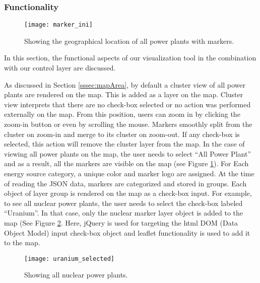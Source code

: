 \subsubsection{Functionality}
\label{sssec:functionality}

\begin{figure} [H]
  \begin{center}
    \texttt{[image: marker\_ini]}
    \caption{Showing the geographical location of all power plants with markers.}
    \label{fig:markerini}
  \end{center}
\end{figure}

In this section, the functional aspects of our visualization tool in the combination with our control layer are discussed.

As discussed in Section \ref{sssec:mapArea}, by default a cluster view of all power plants are rendered on the map. This is added as a layer on the map. Cluster view interprets that there are no check-box selected or no action was performed externally on the map. From this position, users can zoom in by clicking the zoom-in button or even by scrolling the mouse. Markers smoothly split from the cluster on zoom-in and merge to its cluster on zoom-out. If any check-box is selected, this action will remove the cluster layer from the map. In the case of viewing all power plants on the map, the user needs to select “All Power Plant” and as a result, all the markers are visible on the map (see Figure \ref{fig:markerini}). For Each energy source category, a unique color and marker logo are assigned. At the time of reading the JSON data, markers are categorized and stored in groups. Each object of layer group is rendered on the map as a check-box input. For example,  to see all nuclear power plants, the user needs to select the check-box labeled “Uranium”. In that case, only the nuclear marker layer object is added to the map (See Figure \ref{fig:uranium}. Here, jQuery is used for targeting the html DOM (Data Object Model) input check-box object and leaflet functionality is used to add it to the map. 

\begin{figure}
  \begin{center}
    \texttt{[image: uranium\_selected]}
    \caption{Showing all nuclear power plants.}
    \label{fig:uranium}
  \end{center}
\end{figure}

